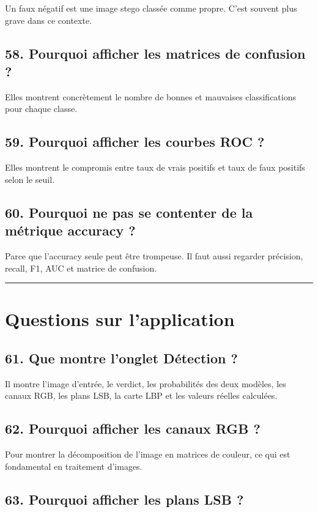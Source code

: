 \documentclass[11pt,a4paper]{article}
\begin{document}
Un faux négatif est une image stego classée comme propre. C'est souvent plus grave dans ce contexte.

\subsection{58. Pourquoi afficher les matrices de confusion ?}

Elles montrent concrètement le nombre de bonnes et mauvaises classifications pour chaque classe.

\subsection{59. Pourquoi afficher les courbes ROC ?}

Elles montrent le compromis entre taux de vrais positifs et taux de faux positifs selon le seuil.

\subsection{60. Pourquoi ne pas se contenter de la métrique accuracy ?}

Parce que l'accuracy seule peut être trompeuse. Il faut aussi regarder précision, recall, F1, AUC et matrice de confusion.

\hrule

\section{Questions sur l'application}

\subsection{61. Que montre l'onglet Détection ?}

Il montre l'image d'entrée, le verdict, les probabilités des deux modèles, les canaux RGB, les plans LSB, la carte LBP et les valeurs réelles calculées.

\subsection{62. Pourquoi afficher les canaux RGB ?}

Pour montrer la décomposition de l'image en matrices de couleur, ce qui est fondamental en traitement d'images.

\subsection{63. Pourquoi afficher les plans LSB ?}
\end{document}
